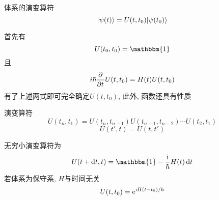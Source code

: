 \documentclass[UTF8]{ctexart}
\numberwithin{equation}{subsection}
\begin{document}
\begin{defi}{体系的演变算符}{}
$$| {\psi(t)} \rangle=U(t,t_0)| {\psi(t_0)} \rangle$$
\end{defi}
首先有
$$U(t_0,t_0)=\mathbbm{1}$$
且
$$i\hbar\frac{\partial^{} }{\partial t^{}}U(t,t_0)=H(t)U(t,t_0)$$
有了上述两式即可完全确定$U(t,t_0)$, 此外, 函数还具有性质
\begin{xz}{演变算符}{}
$$U(t_n,t_1)=U(t_n,t_{n-1})U(t_{n-1},t_{n-2})\cdots U(t_2,t_1)$$
$$U(t',t)=U(t,t')$$
\end{xz}
无穷小演变算符为
$$U(t+\d t,t)=\mathbbm{1}-\f{\i}{\hbar}H(t)\d t$$
若体系为保守系, $H$与时间无关
$$U(t,t_0)=\mathrm{e}^{\mathrm{i} H(t-t_0)/\hbar}$$
\end{document}
